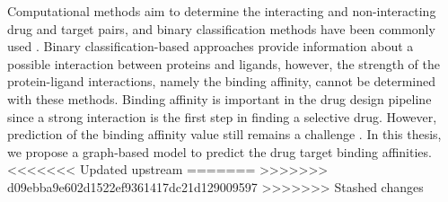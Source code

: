 Computational methods aim to determine the interacting and non-interacting drug and target pairs, and binary classification methods have been commonly used \cite{yamanishi2010drug, liu2016neighborhood, nascimento2016multiple, keum2017self, greenside2017prediction}. Binary classification-based approaches provide information about a possible interaction between proteins and ligands, however, the strength of the protein-ligand interactions, namely the binding affinity, cannot be determined with these methods. Binding affinity is important  in the drug design pipeline since a strong interaction is the first step in finding a selective drug. However, prediction of the binding affinity value still remains a challenge \cite{ozturk2018deepdta}. In this thesis, we propose a graph-based model to predict the drug target binding affinities.
<<<<<<< Updated upstream
=======
>>>>>>> d09ebba9e602d1522ef9361417dc21d129009597
>>>>>>> Stashed changes
